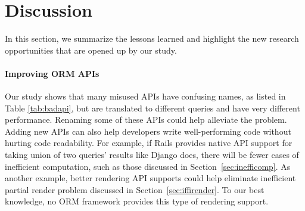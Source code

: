 \section{Discussion}
\label{sec:dis}


In this section, we summarize the lessons learned and highlight the new research opportunities that are opened up by our study.

\vspace{-0.09in}
\paragraph{\bf{Improving ORM APIs}}Our study shows that many misused APIs have confusing names, as listed in Table \ref{tab:badapi}, but are translated to different queries and have very different performance. 
Renaming some of these APIs could help alleviate the problem.
Adding new APIs can also help developers write well-performing code
without hurting code readability. 
For example, if Rails provides native API support for taking union of 
two queries' results like Django \cite{django} does, there will be
fewer cases of inefficient computation, such as those discussed in Section~\ref{sec:inefficomp}.
As another example, better rendering API supports could help eliminate inefficient partial render problem discussed in 
Section~\ref{sec:iffirender}.
To our best knowledge, no ORM framework provides this type of rendering support.

